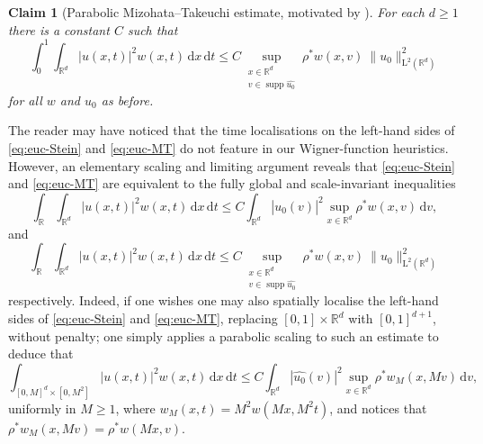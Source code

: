 \documentclass[10pt,a4paper]{amsart}
\newtheorem*{claim}{Claim}
\numberwithin{equation}{section}
\newcommand{\supp}{\operatorname{supp}}
\newcommand{\dd}{\,\mathrm{d}}
\renewcommand{\leq}{\leqslant}
\renewcommand{\le}{\leqslant}
\renewcommand{\geq}{\geqslant}
\begin{document}
\begin{claim}[{Parabolic Mizohata--Takeuchi estimate, motivated by \cite{Tak74,Tak80,Miz85,BRV}}]
For each $d\geq1$ there is a constant $C$ such that
\begin{equation}\label{eq:euc-MT}
\int_0^1\int_{\mathbb{R}^d}|u(x,t)|^2w(x,t)\dd x\dd t
\le C\sup_{\substack{x\in\mathbb{R}^d\\ v\in\supp\widehat{u_0}}}\!\!\!\!\rho^{\ast}w(x,v)\ \|u_0\|_{\mathrm{L}^2(\mathbb{R}^d)}^2
\end{equation}
for all $w$ and $u_0$ as before. 
\end{claim}
The reader may have noticed that the time localisations on the left-hand sides of \eqref{eq:euc-Stein} and \eqref{eq:euc-MT} do not feature in our Wigner-function heuristics. However, an elementary scaling and limiting argument reveals that \eqref{eq:euc-Stein} and \eqref{eq:euc-MT} are equivalent to the fully global and scale-invariant inequalities
\begin{equation}\label{eq:euc-Stein-glo}
\int_{\mathbb{R}}\int_{\mathbb{R}^d}|u(x,t)|^2w(x,t)\dd x\dd t
\le C\int_{\mathbb{R}^d}|\widehat{u_0}(v)|^2\sup_{x\in\mathbb{R}^d}\rho^{\ast}w(x,v)\dd v,
\end{equation}
and 
\begin{equation}\label{eq:euc-MT-glo}
\int_{\mathbb{R}}\int_{\mathbb{R}^d}|u(x,t)|^2w(x,t)\dd x\dd t
\le C\sup_{\substack{x\in\mathbb{R}^d\\ v\in\supp\widehat{u_0}}}\!\!\!\!\rho^{\ast}w(x,v)\ \|u_0\|_{\mathrm{L}^2(\mathbb{R}^d)}^2
\end{equation}
respectively.
Indeed, if one wishes one may also spatially localise the left-hand sides of \eqref{eq:euc-Stein} and \eqref{eq:euc-MT}, replacing $[0,1]\times\mathbb{R}^d$ with $[0,1]^{d+1}$, without penalty; one simply applies a parabolic scaling to such an estimate to deduce that
\[ \int_{[0,M]^{d}\times [0,M^2]}|u(x,t)|^2w(x,t)\dd x\dd t\leq C\int_{\mathbb{R}^d}|\widehat{u_0}(v)|^2\sup_{x\in\mathbb{R}^d}\rho^{\ast}w_M(x,Mv)\dd v, \]
uniformly in $M\geq 1$, where $w_M(x,t)=M^2w(Mx,M^2t)$, and notices that $\rho^{\ast}w_M(x,Mv)=\rho^{\ast}w(Mx,v)$.
\end{document}
